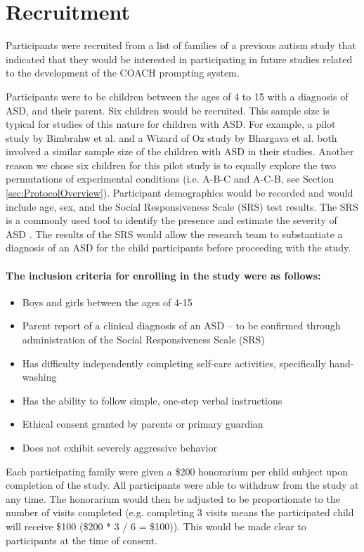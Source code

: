 \section{Recruitment}

Participants were recruited from a list of families of a previous autism study that indicated that they would be interested in participating in future studies related to the development of the COACH prompting system.

Participants were to be children between the ages of 4 to 15 with a diagnosis of ASD, and their parent. Six children would be recruited. This sample size is typical for studies of this nature for children with ASD. For example, a pilot study by Bimbrahw et al. \cite{bimbrahw2012investigating} and a Wizard of Oz study by Bhargava et al. \cite{bhargava2013demonstration} both involved a similar sample size of the children with ASD in their studies. Another reason we chose six children for this pilot study is to equally explore the two permutations of experimental conditions (i.e. A-B-C and A-C-B, see Section \ref{sec:ProtocolOverview}). Participant demographics would be recorded and would include age, sex, and the Social Responsiveness Scale (SRS) test results.  The SRS is a commonly used tool to identify the presence and estimate the severity of ASD \cite{constantino2002social}. The results of the SRS would allow the research team to substantiate a diagnosis of an ASD for the child participants before proceeding with the study.

\paragraph{The \textbf{inclusion criteria} for enrolling in the study were as follows:}
\begin{itemize}
	\item Boys and girls between the ages of 4-15
	\item Parent report of a clinical diagnosis of an ASD – to be confirmed through administration of the Social Responsiveness Scale (SRS)
	\item Has difficulty independently completing self-care activities, specifically hand-washing
	\item Has the ability to follow simple, one-step verbal instructions
	\item Ethical consent  granted by parents or primary guardian
	\item Does not exhibit severely aggressive behavior
\end{itemize}

Each participating family were given a \$200 honorarium per child subject upon completion of the study. All participants were able to withdraw from the study at any time. The honorarium would then be adjusted to be proportionate to the number of visits completed (e.g. completing 3 visits means the participated child will receive \$100 (\$200 * 3 / 6 = \$100)). This would be made clear to participants at the time of consent.
